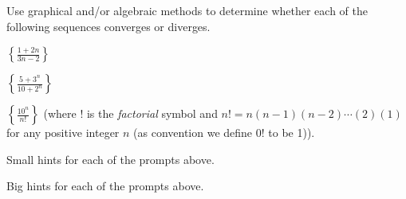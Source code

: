 \begin{activity} \label{8.1.Act3} Use graphical and/or algebraic methods to determine whether each of the following sequences converges or diverges.
\ba
\item $\left\{\frac{1+2n}{3n-2}\right\}$


\item $\left\{\frac{5+3^n}{10+2^n}\right\}$

\item $\left\{\frac{10^n}{n!}\right\}$ (where $!$ is the \emph{factorial} symbol and $n! = n(n-1)(n-2) \cdots (2)(1)$ for any positive integer $n$ (as convention we define $0!$ to be 1)).

\ea
\end{activity}

\begin{smallhint}
\ba
	\item Small hints for each of the prompts above.
\ea
\end{smallhint}
\begin{bighint}
\ba
	\item Big hints for each of the prompts above.
\ea
\end{bighint}
